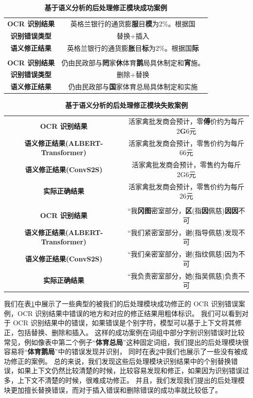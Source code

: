 \begin{table}[!hpt]
	\caption[]{\textbf{基于语义分析的后处理修正模块成功案例}}
	\label{tab:success}
	\centering
	\begin{tabular}{c c}
		\hline
		\textbf{OCR 识别结果} & 英格兰银行的通货膨\textbf{服}目\textbf{模}为2\%。根据国 \\
		\textbf{识别错误类型} & 替换+插入 \\
		\textbf{语义修正结果} & 英格兰银行的通货膨\textbf{胀}目\textbf{标}为2\%。根据国\textbf{际} \\
		\hline
		& \\
		\hline
		\textbf{OCR 识别结果} & 仍由民政部与\textbf{罔}家\textbf{休}体育\textbf{鹅}局具休制定和\textbf{宵}施。 \\
		\textbf{识别错误类型} & 删除+替换 \\
		\textbf{语义修正结果} & 仍由民政部与\textbf{国}家体育总局具体制定和实施 \\
		\hline
	\end{tabular}
\end{table}

\begin{table}[!hpt]
	\caption[]{\textbf{基于语义分析的后处理修正模块失败案例}}
	\label{tab:fail}
	\centering
	\begin{tabular}{c c}
		\hline
		\textbf{OCR 识别结果} & 活家禽批发商会预计，零\textbf{傅}价约为每斤2\textbf{G}6元 \\
		\textbf{语义修正结果(ALBERT-Transformer)} & 活家禽批发商会预计，零售价约为每斤66元 \\
		\textbf{语义修正结果(ConvS2S)} & 活家禽批发商会预计，零售约为每斤2G6元 \\
		\textbf{实际正确结果} & 活家禽批发商会预计，零售价约为每斤26元 \\
		\hline
		& \\
		\hline
		\textbf{OCR 识别结果} & “我\textbf{冈图}密室部分，\textbf{区}(指\textbf{因}佩慈)\textbf{因因}不可 \\
		\textbf{语义修正结果(ALBERT-Transformer)} & “我们紧密室部分，谢(指导佩慈)发现不可 \\
		\textbf{语义修正结果(ConvS2S)} & “我们亲密室部分，谢(指纹佩慈)因为不可 \\
		\textbf{实际正确结果} & “我负责密室部分，她(指吴佩慈)负责不可 \\
		\hline
	\end{tabular}
\end{table}

我们在表\ref{tab:success}中展示了一些典型的被我们的后处理模块成功修正的 OCR 识别错误案例，OCR 识别结果中错误的地方和对应的修正结果用粗体标识。
我们可以看到对于 OCR 识别结果中的错误，如果错误是个别字符，模型可以基于上下文将其修正，包括替换、删除和插入。
这样的成功案例在词组中部分字别识别错误时比较常见，例如像表中第二个例子“\textbf{体育总局}”这种固定词组，我们提出的后处理模块很容易将“\textbf{体育鹅局}”中的错误发现并识别，
同时在表\ref{tab:fail}中我们也展示了一些没有被成功修正的案例。
总的来说，我们发现这些后处理模块识别结果中的个别替换错误，如果上下文仍然比较清楚的时候，比较容易发现和修正，如果因为识别错误过多，上下文不清楚的时候，很难成功修正。
并且，我们发现我们提出的后处理模块更加擅长替换错误，而对于插入错误和删除错误的成功率就比较低了。

